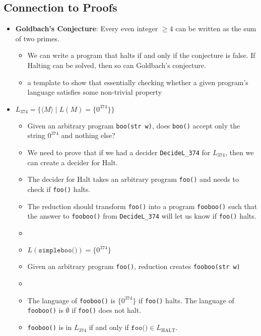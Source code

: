 \documentclass[12pt]{article}
\begin{document}
\subsection{Connection to Proofs}
\begin{itemize}
    \item \textbf{Goldbach's Conjecture}: Every even integer $\geq 4$ can be written as the sum of two primes.
    \begin{itemize}
        \item We can write a program that halts if and only if the conjecture is false. If Halting can be solved, then so can Goldbach's conjecture.
    \end{itemize}
    \begin{itemize}
        \item a template to show that essentially checking whether a given program's language satisfies some non-trivial property
    \end{itemize}
    \item $L_{374} = \{ \langle M \rangle \mid L(M) = \{ 0^{374} \} \}$
    \begin{itemize}
        \item Given an arbitrary program \texttt{boo(str w)}, does \texttt{boo()} accept only the string $0^{374}$ and nothing else?
        \item We need to prove that if we had a decider \texttt{DecideL\_374} for $L_{374}$, then we can create a decider for Halt.
        \item The decider for Halt takes an arbitrary program \texttt{foo()} and needs to check if \texttt{foo()} halts.
        \item The reduction should transform \texttt{foo()} into a program \texttt{fooboo()} such that the answer to \texttt{fooboo()} from \texttt{DecideL\_374} will let us know if \texttt{foo()} halts.
        \item[] 
        \item $L(\texttt{simpleboo()}) = \{ 0^{374} \}$
        \item Given an arbitrary program \texttt{foo()}, reduction creates \texttt{fooboo(str w)}
        \item[] 
        \item The language of \texttt{fooboo()} is $\{ 0^{374} \}$ if \texttt{foo()} halts. The language of \texttt{fooboo()} is $\emptyset$ if \texttt{foo()} does not halt.
        \item \texttt{fooboo()} is in $L_{374}$ if and only if $\texttt{foo()} \in L_{\text{HALT}}$.

\end{itemize}
\end{itemize}
\end{document}
